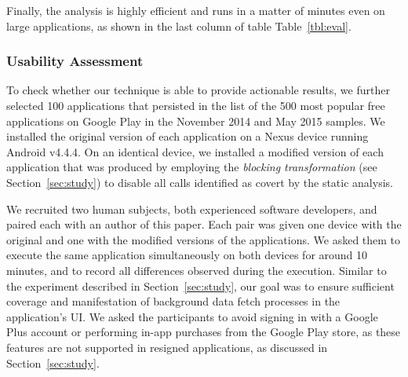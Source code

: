 Finally, the analysis is highly efficient and
runs in a matter of minutes even on large applications, as shown in
the last column of table Table~\ref{tbl:eval}.






\subsubsection{Usability Assessment}
To check whether our technique is able to provide actionable results, we further selected 100 applications that persisted in the list of the 500 most popular free applications on Google Play in the November 2014 and May 2015 samples. 
We installed the original version of each application on a Nexus device running Android v4.4.4.
On an identical device, we installed a modified version of each application that was produced by employing the \emph{blocking transformation} (see Section~\ref{sec:study}) to disable all calls identified as covert by the static analysis. 

We recruited two human subjects, both experienced software developers, and paired each with an author of this paper.
Each pair was given one device with the original and one with the modified versions of the applications. We asked them to execute the same application simultaneously on both devices for around 10 minutes, and to record all differences observed during the execution.
Similar to the experiment described in Section~\ref{sec:study}, our goal was to ensure sufficient coverage and manifestation of background data fetch processes in the application's UI.
We asked the participants to avoid signing in with a Google Plus account or performing in-app purchases from the Google Play store, as these features are not supported in resigned applications, as discussed in Section~\ref{sec:study}.

